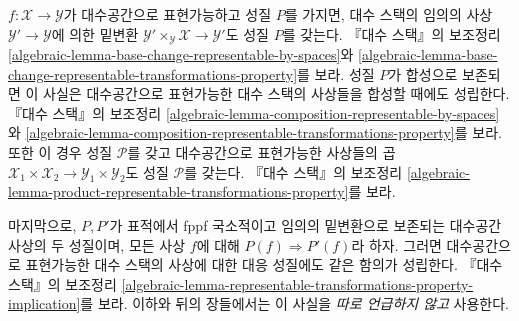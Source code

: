 \medskip\noindent
$f : \mathcal{X} \to \mathcal{Y}$가 대수공간으로 표현가능하고 성질
$P$를 가지면, 대수 스택의 임의의 사상
$\mathcal{Y}' \to \mathcal{Y}$에 의한 밑변환
$\mathcal{Y}' \times_\mathcal{Y} \mathcal{X} \to \mathcal{Y}'$도
성질 $P$를 갖는다. 『대수 스택』의 보조정리
\ref{algebraic-lemma-base-change-representable-by-spaces}와
\ref{algebraic-lemma-base-change-representable-transformations-property}를
보라. 성질 $P$가 합성으로 보존되면 이 사실은 대수공간으로 표현가능한
대수 스택의 사상들을 합성할 때에도 성립한다. 『대수 스택』의 보조정리
\ref{algebraic-lemma-composition-representable-by-spaces}와
\ref{algebraic-lemma-composition-representable-transformations-property}를
보라. 또한 이 경우 성질 $\mathcal{P}$를 갖고 대수공간으로 표현가능한
사상들의 곱
$\mathcal{X}_1 \times \mathcal{X}_2 \to \mathcal{Y}_1 \times \mathcal{Y}_2$도
성질 $\mathcal{P}$를 갖는다. 『대수 스택』의 보조정리
\ref{algebraic-lemma-product-representable-transformations-property}를 보라.

\medskip\noindent
마지막으로, $P, P'$가 표적에서 fppf 국소적이고 임의의 밑변환으로
보존되는 대수공간 사상의 두 성질이며, 모든 사상 $f$에 대해
$P(f) \Rightarrow P'(f)$라 하자. 그러면 대수공간으로 표현가능한
대수 스택의 사상에 대한 대응 성질에도 같은 함의가 성립한다.
『대수 스택』의 보조정리
\ref{algebraic-lemma-representable-transformations-property-implication}를
보라. 이하와 뒤의 장들에서는 이 사실을 {\it 따로 언급하지 않고} 사용한다.


